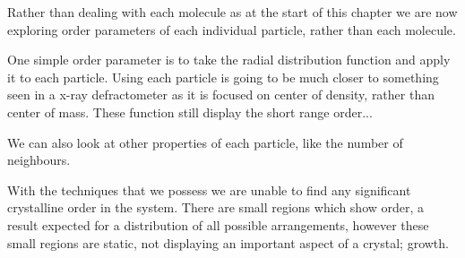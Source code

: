 Rather than dealing with each molecule as at the start of this chapter we are now exploring order parameters of each individual particle, rather than each molecule.

One simple order parameter is to take the radial distribution function and apply it to each particle. Using each particle is going to be much closer to something seen in a x-ray defractometer as it is focused on center of density, rather than center of mass. These function still display the short range order...


We can also look at other properties of each particle, like the number of neighbours.

With the techniques that we possess we are unable to find any significant crystalline order in the system. There are small regions which show order, a result expected for a distribution of all possible arrangements, however these small regions are static, not displaying an important aspect of a crystal; growth.




